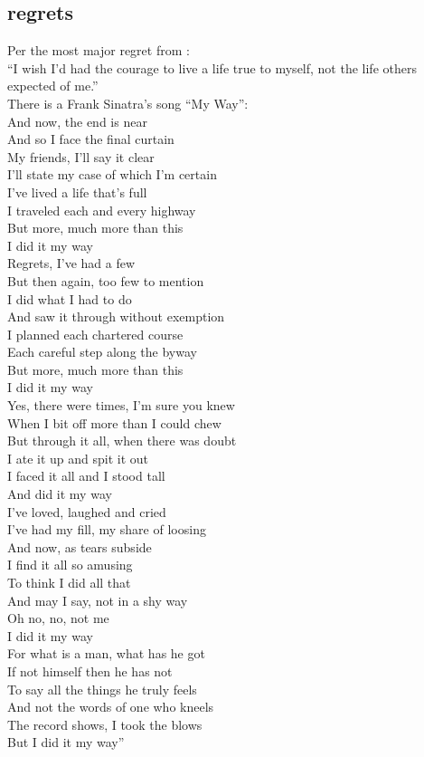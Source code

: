 \documentclass[10pt, letterpaper]{article}
\begin{document}
\begin{spacing}{1.8}
\section{regrets}

Per the most major regret from \cite{ware12}:\\

``I wish I'd had the courage to live a life true to myself, not the life others
expected of me.''\\

{There is a Frank Sinatra's song ``My Way'':\\
And now, the end is near\\
And so I face the final curtain\\
My friends, I'll say it clear\\
I'll state my case of which I'm certain\\
I've lived a life that's full\\
I traveled each and every highway\\
But more, much more than this\\
I did it my way\\
Regrets, I've had a few\\
But then again, too few to mention\\
I did what I had to do\\
And saw it through without exemption\\
I planned each chartered course\\
Each careful step along the byway\\
But more, much more than this\\
I did it my way\\
Yes, there were times, I'm sure you knew\\
When I bit off more than I could chew\\
But through it all, when there was doubt\\
I ate it up and spit it out\\
I faced it all and I stood tall\\
And did it my way\\
I've loved, laughed and cried\\
I've had my fill, my share of loosing\\
And now, as tears subside\\
I find it all so amusing\\
To think I did all that\\
And may I say, not in a shy way\\
Oh no, no, not me\\
I did it my way\\
For what is a man, what has he got\\
If not himself then he has not\\
To say all the things he truly feels\\
And not the words of one who kneels\\
The record shows, I took the blows\\
But I did it my way''}\\



\end{spacing}
\end{document}
